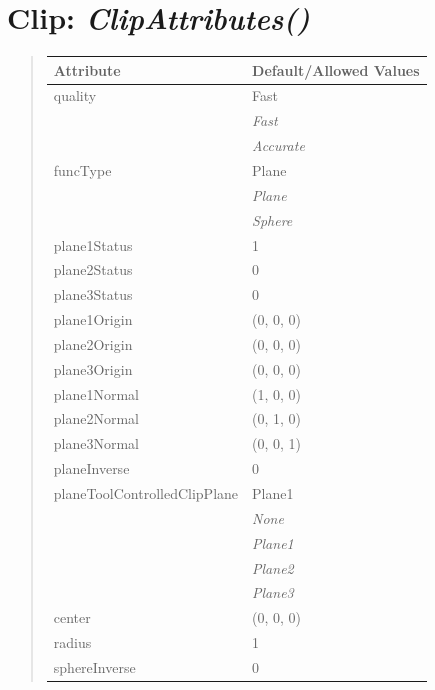 \documentclass[letterpaper,10pt,english]{sphinxmanual}
\begin{document}
\section{\textbf{Clip}: \emph{ClipAttributes()}}
\label{attributes:clip-clipattributes}
\begin{DUlineblock}{0em}
\item[] 
\end{DUlineblock}
\begin{quote}

\begin{tabulary}{\linewidth}{|L|L|}
\hline

\textbf{Attribute}
 & 
\textbf{Default/Allowed Values}
\\
\hline
quality
 & 
Fast
\\
\hline & 
\emph{Fast}
\\
\hline & 
\emph{Accurate}
\\
\hline
funcType
 & 
Plane
\\
\hline & 
\emph{Plane}
\\
\hline & 
\emph{Sphere}
\\
\hline
plane1Status
 & 
1
\\
\hline
plane2Status
 & 
0
\\
\hline
plane3Status
 & 
0
\\
\hline
plane1Origin
 & 
(0, 0, 0)
\\
\hline
plane2Origin
 & 
(0, 0, 0)
\\
\hline
plane3Origin
 & 
(0, 0, 0)
\\
\hline
plane1Normal
 & 
(1, 0, 0)
\\
\hline
plane2Normal
 & 
(0, 1, 0)
\\
\hline
plane3Normal
 & 
(0, 0, 1)
\\
\hline
planeInverse
 & 
0
\\
\hline
planeToolControlledClipPlane
 & 
Plane1
\\
\hline & 
\emph{None}
\\
\hline & 
\emph{Plane1}
\\
\hline & 
\emph{Plane2}
\\
\hline & 
\emph{Plane3}
\\
\hline
center
 & 
(0, 0, 0)
\\
\hline
radius
 & 
1
\\
\hline
sphereInverse
 & 
0
\\
\hline\end{tabulary}

\end{quote}
\end{document}
